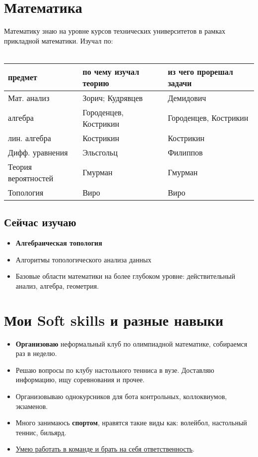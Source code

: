 \documentclass[a4paper,12pt]{article}
\begin{document}
\section{Математика}

Математику знаю на уровне курсов технических университетов в рамках прикладной математики. 
 Изучал по: \\
\\

\begin{tabular}{ | l | l | l | }
    \hline
        предмет & по чему изучал теорию & из чего прорешал задачи \\ \hline
        Мат. анализ & Зорич; Кудрявцев & Демидович \\
        алгебра & Городенцев, Кострикин & Городенцев,  Кострикин \\
        лин. алгебра & Кострикин & Кострикин \\
        Дифф. уравнения & Эльсгольц & Филиппов \\
        Теория вероятностей & Гмурман & Гмурман \\
        Топология & Виро & Виро\\
    \hline
\end{tabular}
\subsection{Сейчас изучаю}
\begin{itemize}
    \item \textbf{Алгебраическая топология}
    \item Алгоритмы топологического анализа данных
    \item Базовые области математики на более глубоком уровне: действительный анализ, алгебра, геометрия.
\end{itemize}

\section{Мои Soft skills и разные навыки}
\begin{itemize}
    \item \textbf{Организоваю} неформальный клуб по олимпиадной математике, собираемся раз в неделю.
    \item Решаю вопросы по клубу настольного тенниса в вузе. Доставляю информацию, ищу соревнования и прочее.
    \item Организовываю однокурсников для бота контрольных, коллоквиумов, экзаменов.
    \item Много занимаюсь \textbf{спортом}, нравятся такие виды как: волейбол, настольный теннис, бильярд.
    \item \underline{Умею работать в команде и брать на себя ответственность}.
\end{itemize}
\end{document}
